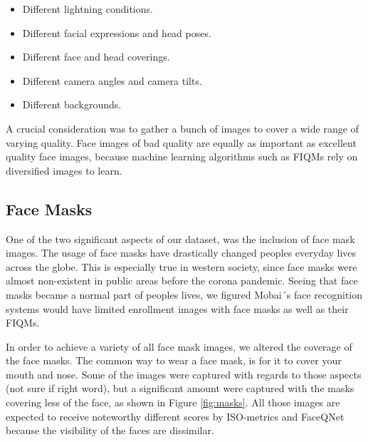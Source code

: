 \begin{itemize}
    \item Different lightning conditions.
    \item Different facial expressions and head poses.
    \item Different face and head coverings. 
    \item Different camera angles and camera tilts.
    \item Different backgrounds.
\end{itemize}

A crucial consideration was to gather a bunch of images to cover a wide range of varying quality. Face images of bad quality are equally as important as excellent quality face images, because machine learning algorithms such as FIQMs rely on diversified images to learn.  

\subsection*{Face Masks}
One of the two significant aspects of our dataset, was the inclusion of face mask images. The usage of face masks have drastically changed peoples everyday lives across the globe. This is especially true in western society, since face masks were almost non-existent in public areas before the corona pandemic. Seeing that face masks became a normal part of peoples lives, we figured Mobai´s face recognition systems would have limited enrollment images with face masks as well as their FIQMs. 

In order to achieve a variety of all face mask images, we altered the coverage of the face masks. The common way to wear a face mask, is for it to cover your mouth and nose. Some of the images were captured with regards to those aspects (not sure if right word), but a significant amount were captured with the masks covering less of the face, as shown in Figure \ref{fig:masks}. All those images are expected to receive noteworthy different scores by ISO-metrics and FaceQNet because the visibility of the faces are dissimilar.  

